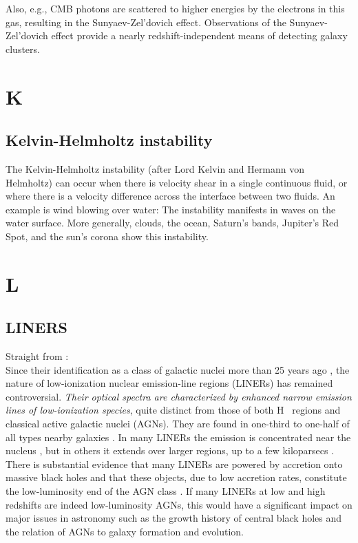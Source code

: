 \documentclass[11pt]{article}
\begin{document}
    Also, e.g., CMB photons are scattered to higher energies by the
    electrons in this gas, resulting in the Sunyaev-Zel'dovich
    effect. Observations of the Sunyaev-Zel'dovich effect provide a nearly
    redshift-independent means of detecting galaxy clusters.

\section*{K}
\subsection*{Kelvin-Helmholtz instability}
The Kelvin-Helmholtz instability (after Lord Kelvin and Hermann von
Helmholtz) can occur when there is velocity shear in a single
continuous fluid, or where there is a velocity difference across the
interface between two fluids. An example is wind blowing over water:
The instability manifests in waves on the water surface. More
generally, clouds, the ocean, Saturn's bands, Jupiter's Red Spot, and
the sun's corona show this instability. 

\section*{L}
\subsection*{LINERS}
Straight from \citet{Sturm2006}:\\
Since their identification as a class of galactic nuclei more than 25
years ago \citep{Heckman1980}, the nature of low-ionization nuclear
emission-line regions (LINERs) has remained controversial. {\it Their
optical spectra are characterized by enhanced narrow emission lines of
low-ionization species}, quite distinct from those of both {H~}
regions and classical active galactic nuclei (AGNs). They are found in
one-third to one-half of all types nearby galaxies
\citep[e.g.,][]{Ho1997}. In many LINERs the emission is concentrated
near the nucleus \citep[a few times 100 pc; e.g, ][]{Pogge2000}, but
in others it extends over larger regions, up to a few kiloparsecs
\cite{Veilleux1995}.  There is substantial evidence that many LINERs
are powered by accretion onto massive black holes and that these
objects, due to low accretion rates, constitute the low-luminosity end
of the AGN class \citep[][]{Quataert2001, Kewley2006}. If many LINERs
at low and high redshifts are indeed low-luminosity AGNs, this would
have a significant impact on major issues in astronomy such as the
growth history of central black holes and the relation of AGNs to
galaxy formation and evolution.
\end{document}

